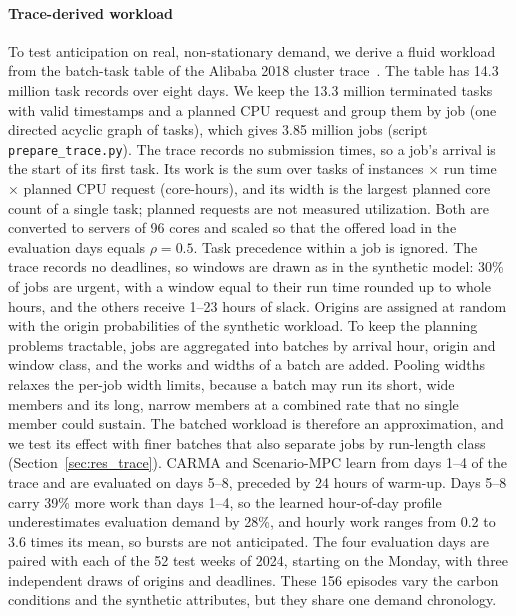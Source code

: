 \paragraph{Trace-derived workload} To test anticipation on real, non-stationary demand, we derive a fluid workload from the batch-task table of the Alibaba 2018 cluster trace~\cite{alibaba2018trace,guo2019limits}. The table has 14.3 million task records over eight days. We keep the 13.3 million terminated tasks with valid timestamps and a planned CPU request and group them by job (one directed acyclic graph of tasks), which gives 3.85 million jobs (script \texttt{prepare\_trace.py}). The trace records no submission times, so a job's arrival is the start of its first task. Its work is the sum over tasks of instances $\times$ run time $\times$ planned CPU request (core-hours), and its width is the largest planned core count of a single task; planned requests are not measured utilization. Both are converted to servers of 96 cores and scaled so that the offered load in the evaluation days equals $\rho=0.5$. Task precedence within a job is ignored. The trace records no deadlines, so windows are drawn as in the synthetic model: 30\% of jobs are urgent, with a window equal to their run time rounded up to whole hours, and the others receive 1--23 hours of slack. Origins are assigned at random with the origin probabilities of the synthetic workload. To keep the planning problems tractable, jobs are aggregated into batches by arrival hour, origin and window class, and the works and widths of a batch are added. Pooling widths relaxes the per-job width limits, because a batch may run its short, wide members and its long, narrow members at a combined rate that no single member could sustain. The batched workload is therefore an approximation, and we test its effect with finer batches that also separate jobs by run-length class (Section~\ref{sec:res_trace}). CARMA and Scenario-MPC learn from days 1--4 of the trace and are evaluated on days 5--8, preceded by 24 hours of warm-up. Days 5--8 carry 39\% more work than days 1--4, so the learned hour-of-day profile underestimates evaluation demand by 28\%, and hourly work ranges from 0.2 to 3.6 times its mean, so bursts are not anticipated. The four evaluation days are paired with each of the 52 test weeks of 2024, starting on the Monday, with three independent draws of origins and deadlines. These 156 episodes vary the carbon conditions and the synthetic attributes, but they share one demand chronology.

